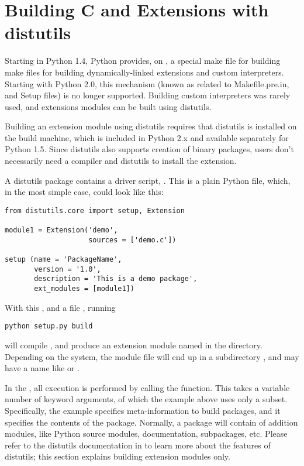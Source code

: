 \chapter{Building C and \Cpp{} Extensions with distutils
     \label{building}}


Starting in Python 1.4, Python provides, on \UNIX{}, a special make
file for building make files for building dynamically-linked
extensions and custom interpreters.  Starting with Python 2.0, this
mechanism (known as related to Makefile.pre.in, and Setup files) is no
longer supported. Building custom interpreters was rarely used, and
extensions modules can be built using distutils.

Building an extension module using distutils requires that distutils
is installed on the build machine, which is included in Python 2.x and
available separately for Python 1.5. Since distutils also supports
creation of binary packages, users don't necessarily need a compiler
and distutils to install the extension.

A distutils package contains a driver script, . This is
a plain Python file, which, in the most simple case, could look like
this:

\begin{verbatim}
from distutils.core import setup, Extension

module1 = Extension('demo',
                    sources = ['demo.c'])

setup (name = 'PackageName',
       version = '1.0',
       description = 'This is a demo package',
       ext_modules = [module1])

\end{verbatim}

With this , and a file , running

\begin{verbatim}
python setup.py build 
\end{verbatim}

will compile , and produce an extension module named
 in the  directory. Depending on the system,
the module file will end up in a subdirectory ,
and may have a name like  or .

In the , all execution is performed by calling the
 function. This takes a variable number of keyword 
arguments, of which the example above uses only a
subset. Specifically, the example specifies meta-information to build
packages, and it specifies the contents of the package.  Normally, a
package will contain of addition modules, like Python source modules,
documentation, subpackages, etc. Please refer to the distutils
documentation in  to learn more about the features of distutils; this section
explains building extension modules only.

